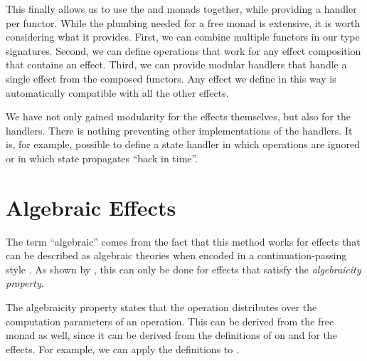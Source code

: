 
This finally allows us to use the  and  monads together, while providing a handler per functor. While the plumbing needed for a free monad is extensive, it is worth considering what it provides. First, we can combine multiple functors in our type signatures. Second, we can define operations that work for any effect composition that contains an effect. Third, we can provide modular handlers that handle a single effect from the composed functors. Any effect we define in this way is automatically compatible with all the other effects.

We have not only gained modularity for the effects themselves, but also for the handlers. There is nothing preventing other implementations of the handlers. It is, for example, possible to define a state handler in which  operations are ignored or in which state propagates ``back in time''.

\section{Algebraic Effects}

The term ``algebraic'' comes from the fact that this method works for effects that can be described as algebraic theories when encoded in a continuation-passing style \autocite{goos_adequacy_2001}. As shown by \textcite{plotkin_algebraic_2003}, this can only be done for effects that satisfy the \emph{algebraicity property}.

The algebraicity property states that the \hs{>>=} operation distributes over the computation parameters of an operation. This can be derived from the free monad as well, since it can be derived from the definitions of \hs{>>=} on  and  for the effects. For example, we can apply the definitions to .

